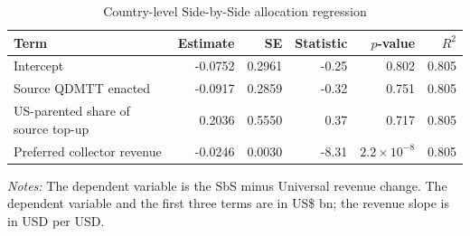\begin{table}[H]
\centering
\footnotesize
\setlength{\tabcolsep}{3pt}
\caption{Country-level Side-by-Side allocation regression}
\label{tab:app_stage45_h4_regression}
\begin{tabular}{@{}lrrrrr@{}}
\toprule
Term & Estimate & SE & Statistic & $p$-value & $R^2$ \\
\midrule
Intercept & -0.0752 & 0.2961 & -0.25 & 0.802 & 0.805 \\
Source QDMTT enacted & -0.0917 & 0.2859 & -0.32 & 0.751 & 0.805 \\
US-parented share of source top-up &  0.2036 & 0.5550 &  0.37 & 0.717 & 0.805 \\
Preferred collector revenue & -0.0246 & 0.0030 & -8.31 & $2.2 \times 10^{-8}$ & 0.805 \\
\bottomrule
\end{tabular}

\vspace{0.35em}
\noindent\begin{minipage}{\textwidth}
\footnotesize\raggedright\textit{Notes:} The dependent variable is the SbS minus Universal revenue change. The dependent variable and the first three terms are in US\$ bn; the revenue slope is in USD per USD.
\end{minipage}
\end{table}
